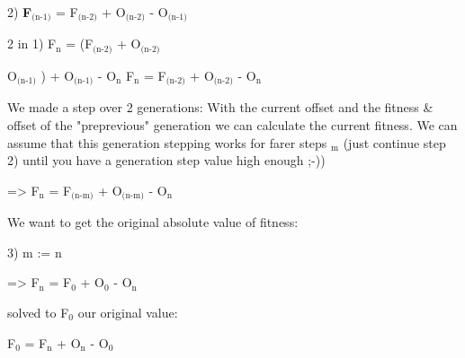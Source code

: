 \begin{DoxyPre}2) {\bfseries F$_{\mbox{(n-1)}}$ } = F$_{\mbox{(n-2)}}$ 
+ O$_{\mbox{(n-2)}}$  - O$_{\mbox{(n-1)}}$ \end{DoxyPre}



\begin{DoxyPre}2 in 1)
   F$_{\mbox{n}}$  = (F$_{\mbox{(n-2)}}$  + O$_{\mbox{(n-2)}}$ 
\begin{DoxyItemize}
\item O$_{\mbox{(n-1)}}$ ) + O$_{\mbox{(n-1)}}$  - O$_{\mbox{n}}$ 
   F$_{\mbox{n}}$  = F$_{\mbox{(n-2)}}$  + O$_{\mbox{(n-2)}}$  - O$_{\mbox{n}}$ 
\end{DoxyItemize}\end{DoxyPre}



\begin{DoxyPre}We made a step over 2 generations: With the current offset and the
fitness \& offset of the
"preprevious" generation we can calculate the current fitness.
We can assume that this generation stepping works for farer steps
$_{\mbox{m}}$  (just continue step 2) until you have a generation step value
high enough ;-))\end{DoxyPre}



\begin{DoxyPre}=> F$_{\mbox{n}}$  = F$_{\mbox{(n-m)}}$  + O$_{\mbox{(n-m)}}$  - O$_{\mbox{n}}$ \end{DoxyPre}



\begin{DoxyPre}We want to get the original absolute value of fitness:\end{DoxyPre}



\begin{DoxyPre}3) m := n\end{DoxyPre}



\begin{DoxyPre}=> F$_{\mbox{n}}$  = F$_{\mbox{0}}$  + O$_{\mbox{0}}$  - O$_{\mbox{n}}$ \end{DoxyPre}



\begin{DoxyPre}solved to F$_{\mbox{0}}$  our original value:\end{DoxyPre}



\begin{DoxyPre}F$_{\mbox{0}}$  = F$_{\mbox{n}}$  + O$_{\mbox{n}}$  - O$_{\mbox{0}}$ \end{DoxyPre}



